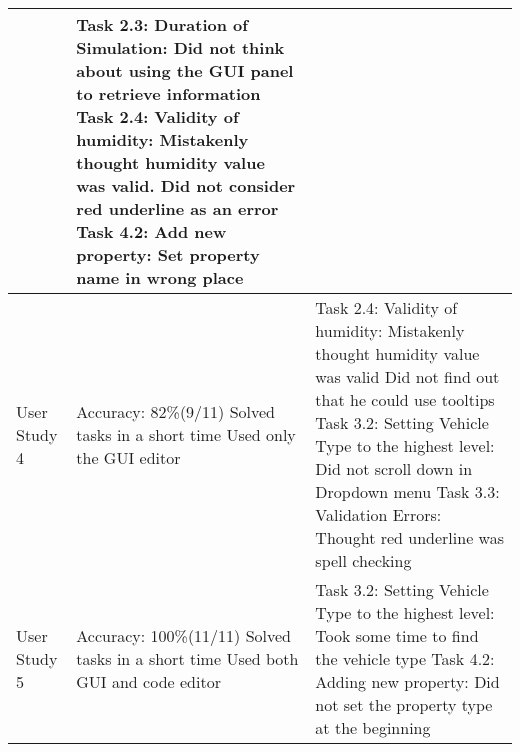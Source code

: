 \begin{table*}[!htbp]
\begin{tabular}{lp{4.5cm}p{6cm}}
            &

            Task 2.3: Duration of Simulation:\newline
            Did not think about using the GUI panel to retrieve information\newline
            Task 2.4: Validity of humidity:\newline
            Mistakenly thought humidity value was valid.\newline
            Did not consider red underline as an error\newline
            Task 4.2: Add new property:\newline
            Set property name in wrong place
         \\ \midrule

        User Study 4 &
            Accuracy: 82\%(9/11)\newline
            Solved tasks in a short time\newline
            Used only the GUI editor

            &

            Task 2.4: Validity of humidity:\newline
            Mistakenly thought humidity value was valid\newline
            Did not find out that he could use tooltips\newline
            Task 3.2: Setting Vehicle Type to the highest level: \newline
            Did not scroll down in Dropdown menu\newline
            Task 3.3: Validation Errors:\newline
            Thought red underline was spell checking \\ \midrule

        User Study 5 &
            Accuracy: 100\%(11/11)\newline
            Solved tasks in a short time\newline
            Used both GUI and code editor

            &

            Task 3.2: Setting Vehicle Type to the highest level: \newline
            Took some time to find the vehicle type \newline
            Task 4.2: Adding new property:\newline
        Did not set the property type at the beginning \\ \bottomrule
    \end{tabular}
\end{table*}



